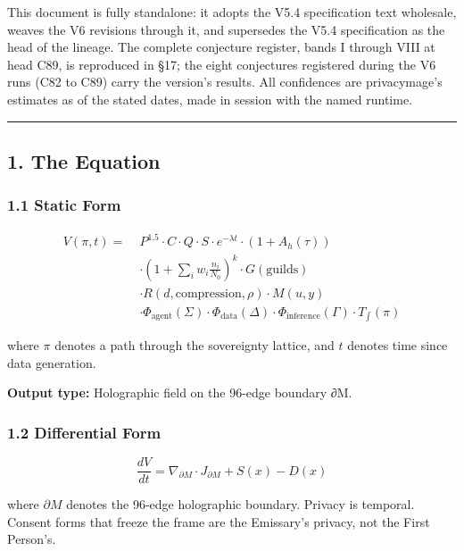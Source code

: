 \documentclass[
]{article}
\begin{document}
This document is fully standalone: it adopts the V5.4 specification text
wholesale, weaves the V6 revisions through it, and supersedes the V5.4
specification as the head of the lineage. The complete conjecture
register, bands I through VIII at head C89, is reproduced in §17; the
eight conjectures registered during the V6 runs (C82 to C89) carry the
version's results. All confidences are privacymage's estimates as of the
stated dates, made in session with the named runtime.

\begin{center}\rule{0.5\linewidth}{0.5pt}\end{center}

\subsection{1. The Equation}\label{the-equation}

\subsubsection{1.1 Static Form}\label{static-form}

\[\begin{aligned}
V(\pi, t) = \; & P^{1.5} \cdot C \cdot Q \cdot S \cdot e^{-\lambda t} \cdot (1 + A_h(\tau)) \\
& \cdot \left(1 + \sum_i w_i \frac{n_i}{N_0}\right)^{k} \cdot G(\text{guilds}) \\
& \cdot R(d, \text{compression}, \rho) \cdot M(u, y) \\
& \cdot \Phi_{\text{agent}}(\Sigma) \cdot \Phi_{\text{data}}(\Delta) \cdot \Phi_{\text{inference}}(\Gamma) \cdot T_{\int}(\pi)
\end{aligned}\]

where \(\pi\) denotes a path through the sovereignty lattice, and \(t\)
denotes time since data generation.

\textbf{Output type:} Holographic field on the 96-edge boundary ∂M.

\subsubsection{1.2 Differential Form}\label{differential-form}

\[\frac{dV}{dt} = \nabla_{\partial M} \cdot J_{\partial M} + S(x) - D(x)\]

where \(\partial M\) denotes the 96-edge holographic boundary. Privacy
is temporal. Consent forms that freeze the frame are the Emissary's
privacy, not the First Person's.
\end{document}
